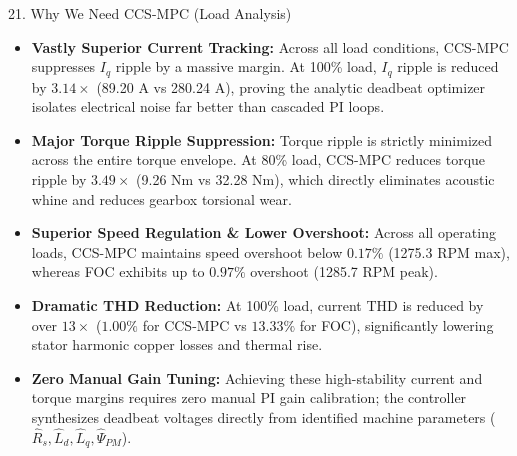 \documentclass[aspectratio=169]{beamer}
\begin{document}
\begin{frame}{21. Why We Need CCS-MPC (Load Analysis)}
    \footnotesize
    \begin{itemize}
        \setlength{\itemsep}{3pt}
        \setlength{\parskip}{0pt}
        \item \textbf{Vastly Superior Current Tracking:} Across all load conditions, CCS-MPC suppresses $I_q$ ripple by a massive margin. At 100\% load, $I_q$ ripple is reduced by \textbf{$3.14\times$} (89.20 A vs 280.24 A), proving the analytic deadbeat optimizer isolates electrical noise far better than cascaded PI loops.
        \item \textbf{Major Torque Ripple Suppression:} Torque ripple is strictly minimized across the entire torque envelope. At 80\% load, CCS-MPC reduces torque ripple by \textbf{$3.49\times$} (9.26 Nm vs 32.28 Nm), which directly eliminates acoustic whine and reduces gearbox torsional wear.
        \item \textbf{Superior Speed Regulation \& Lower Overshoot:} Across all operating loads, CCS-MPC maintains speed overshoot below \textbf{$0.17\%$} (1275.3 RPM max), whereas FOC exhibits up to \textbf{$0.97\%$} overshoot (1285.7 RPM peak).
        \item \textbf{Dramatic THD Reduction:} At 100\% load, current THD is reduced by over \textbf{$13\times$} ($1.00\%$ for CCS-MPC vs $13.33\%$ for FOC), significantly lowering stator harmonic copper losses and thermal rise.
        \item \textbf{Zero Manual Gain Tuning:} Achieving these high-stability current and torque margins requires zero manual PI gain calibration; the controller synthesizes deadbeat voltages directly from identified machine parameters ($\hat{R}_s, \hat{L}_d, \hat{L}_q, \hat{\Psi}_{PM}$).
    \end{itemize}
\end{frame}
\end{document}
